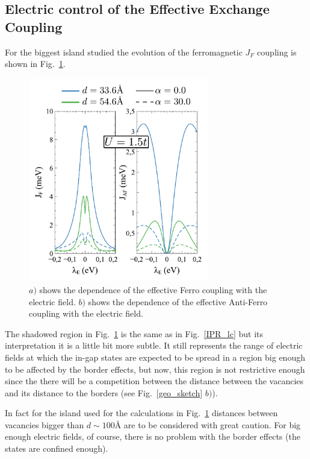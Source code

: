 \subsection{Electric control of the Effective Exchange Coupling} %
For the biggest island studied the evolution of the ferromagnetic $J_F$ coupling is shown in Fig.~\ref{exchange}.

\begin{figure}[h!]
\centering
\includegraphics[width=0.7\textwidth]{chapter06/figures/exchange.pdf}
\vspace{-5pt}
\caption{$a)$ shows the dependence of the effective Ferro coupling with the electric field. $b)$ shows the dependence of the effective Anti-Ferro coupling with the electric field.}
\label{exchange}
\end{figure}
\FloatBarrier

The shadowed region in Fig.~\ref{exchange} is the same as in Fig.~\ref{IPR_lc} but its interpretation it is a little bit more subtle. It still represents the range of electric fields at which the in-gap states are expected to be spread in a region big enough to be affected by the border effects, but now, this region is not restrictive enough since the there will be a competition between the distance between the vacancies and its distance to the borders (see Fig.~\ref{geo_sketch} $b)$).

In fact for the island used for the calculations in Fig.~\ref{exchange} distances between vacancies bigger than $d\sim 100\text{\AA}$ are to be considered with great caution. For big enough electric fields, of course, there is no problem with the border effects (the states are confined enough).


